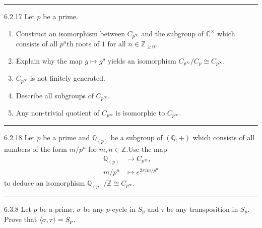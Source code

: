 \documentclass[a4paper, 12pt]{article}
\begin{document}
\noindent\rule{7in}{2.8pt}
\begin{problem}{6.2.17}
Let \(p\) be a prime.
\begin{enumerate}[(1)]
\item Construct an isomorphism between \(C_{p^\infty}\) and the subgroup of \(\mathbb{C}^\times\) which consists of all \(p^n\)th roots of \(1\) for all \(n\in \mathbb{Z}_{\geq 0}\).
\item Explain why the map \(g\mapsto g^p\) yields an isomorphism \(C_{p^\infty}/C_p\cong C_{p^\infty}\).
\item \(C_{p^\infty}\) is not finitely generated.
\item Describe all subgroups of \(C_{p^\infty}\).
\item Any non-trivial quotient of \(C_{p^\infty}\) is isomorphic to \(C_{p^\infty}\).
\end{enumerate}
\end{problem}
\begin{solution}
    
\end{solution}

\noindent\rule{7in}{2.8pt}
\begin{problem}{6.2.18}
Let \(p\) be a prime and \(\mathbb{Q}_{(p)}\) be a subgroup of \((\mathbb{Q},+)\) which consists of all numbers of the form \(m/p^n\) for \(m,n\in \mathbb{Z}\).Use the map 
\begin{align*}
    \mathbb{Q}_{(p)}&\rightarrow C_{p^\infty},\\ 
    m/p^n&\mapsto e^{2\pi im/p^n}
\end{align*} 
to deduce an isomorphism \(\mathbb{Q}_{(p)}/\mathbb{Z}\cong C_{p^\infty}\).  
\end{problem}
\begin{solution}
    
\end{solution}

\noindent\rule{7in}{2.8pt}
\begin{problem}{6.3.8}
Let \(p\) be a prime, \(\sigma\) be any \(p\)-cycle in \(S_p\) and \(\tau\) be any transposition in \(S_p\). Prove that \(\langle \sigma,\tau\rangle=S_p\).
\end{problem}
\begin{solution}
    
\end{solution}
\end{document}
